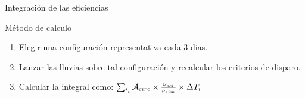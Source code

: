 \begin{frame}{Integraci\'on de las eficiencias}
	\begin{block}{M\'etodo de calculo}
	\begin{enumerate}
	 \item Elegir una configuraci\'on representativa cada 3 dias.
	 \item Lanzar las lluvias sobre tal configuraci\'on y recalcular los criterios de disparo.
	 
	 \begin{center}  
	 \end{center}
	 \item Calcular la integral como: $\sum_{t_i} {\cal A}_{circ} \times \frac{\nu_{sel}}{\nu_{sim}} \times \Delta T_i$
	\end{enumerate}

	\end{block}
% 		
\end{frame}
% 
% 
